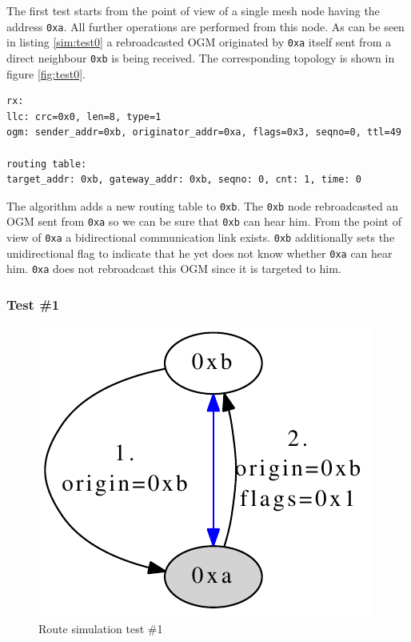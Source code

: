 The first test starts from the point of view of a single mesh node having the address \texttt{0xa}. All further operations are performed from this node. As can be seen in listing \ref{sim:test0} a rebroadcasted OGM originated by \texttt{0xa} itself sent from a direct neighbour \texttt{0xb} is being received. The corresponding topology is shown in figure \ref{fig:test0}.

\begin{lstlisting}[label=sim:test0,caption=Output of Test \#0]
rx:
llc: crc=0x0, len=8, type=1
ogm: sender_addr=0xb, originator_addr=0xa, flags=0x3, seqno=0, ttl=49

routing table: 
target_addr: 0xb, gateway_addr: 0xb, seqno: 0, cnt: 1, time: 0
\end{lstlisting}

The algorithm adds a new routing table to \texttt{0xb}. The \texttt{0xb} node rebroadcasted an OGM sent from \texttt{0xa} so we can be sure that \texttt{0xb} can hear him. From the point of view of \texttt{0xa} a bidirectional communication link exists. \texttt{0xb} additionally sets the unidirectional flag to indicate that he yet does not know whether \texttt{0xa} can hear him. \texttt{0xa} does not rebroadcast this OGM since it is targeted to him.

\subsubsection{Test \#1}%
\begin{figure}[H]
  \begin{center}
    \includegraphics[]{figures/test1}
  \end{center}
  \caption{Route simulation test \#1}
  \label{fig:test1}
\end{figure}

